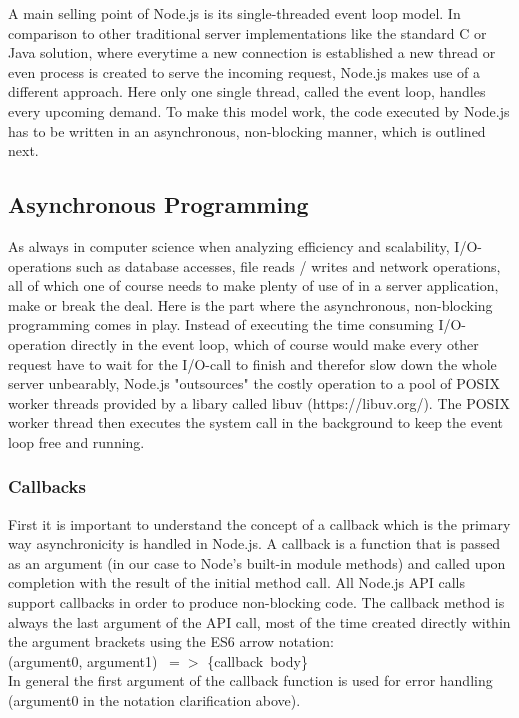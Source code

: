 \documentclass{bioinfo}
\begin{document}
A main selling point of Node.js is its single-threaded event loop model. In comparison to other traditional server implementations like the standard C or Java solution, where everytime a new connection is established a new thread or even process is created to serve the incoming request, Node.js makes use of a different approach. Here only one single thread, called the event loop, handles every upcoming demand. To make this model work, the code executed by Node.js has to be written in an asynchronous, non-blocking manner, which is outlined next.

\subsection{Asynchronous Programming}
As always in computer science when analyzing efficiency and scalability, I/O-operations such as database accesses, file reads / writes and network operations, all of which one of course needs to make plenty of use of in a server application, make or break the deal. Here is the part where the asynchronous, non-blocking programming comes in play. Instead of executing the time consuming I/O-operation directly in the event loop, which of course would make every other request have to wait for the I/O-call to finish and therefor slow down the whole server unbearably, Node.js "outsources" the costly operation to a pool of POSIX worker threads provided by a libary called libuv (https://libuv.org/). The POSIX worker thread then executes the system call in the background to keep the event loop free and running.

\subsubsection{Callbacks}
First it is important to understand the concept of a callback which is the primary way asynchronicity is handled in Node.js. A callback is a function that is passed as an argument (in our case to Node's built-in module methods) and called upon completion with the result of the initial method call. All Node.js API calls support callbacks in order to produce non-blocking code. The callback method is always the last argument of the API call, most of the time created directly within the argument brackets using the ES6 arrow notation: \\(argument0, argument1) $\ =>$ \{callback\ body\}\\
In general the first argument of the callback function is used for error handling (argument0 in the notation clarification above).
\end{document}
